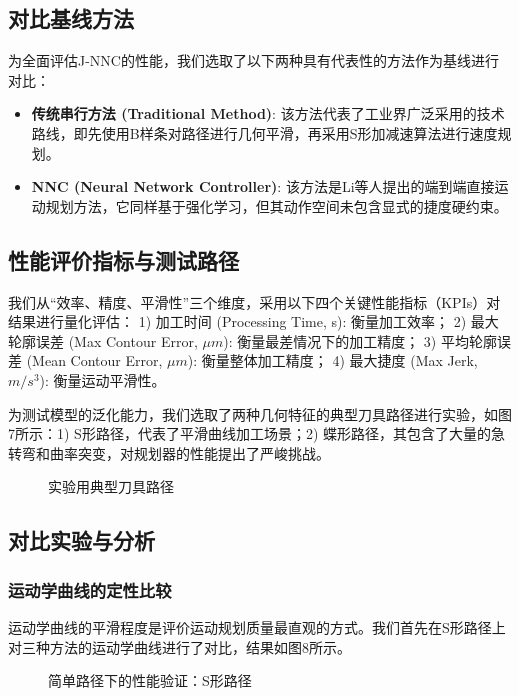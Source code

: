 \documentclass[preprint,12pt]{elsarticle}
\begin{document}
\subsection{对比基线方法}
为全面评估J-NNC的性能，我们选取了以下两种具有代表性的方法作为基线进行对比：
\begin{itemize}
    \item \textbf{传统串行方法 (Traditional Method)}: 该方法代表了工业界广泛采用的技术路线，即先使用B样条对路径进行几何平滑，再采用S形加减速算法进行速度规划。
    \item \textbf{NNC (Neural Network Controller)}: 该方法是Li等人提出的端到端直接运动规划方法\cite{Li2020}，它同样基于强化学习，但其动作空间未包含显式的捷度硬约束。
\end{itemize}

\subsection{性能评价指标与测试路径}
我们从“效率、精度、平滑性”三个维度，采用以下四个关键性能指标（KPIs）对结果进行量化评估：
1) 加工时间 (Processing Time, s): 衡量加工效率；
2) 最大轮廓误差 (Max Contour Error, $\mu m$): 衡量最差情况下的加工精度；
3) 平均轮廓误差 (Mean Contour Error, $\mu m$): 衡量整体加工精度；
4) 最大捷度 (Max Jerk, $m/s^3$): 衡量运动平滑性。

为测试模型的泛化能力，我们选取了两种几何特征的典型刀具路径进行实验，如图7所示：1) S形路径，代表了平滑曲线加工场景；2) 蝶形路径，其包含了大量的急转弯和曲率突变，对规划器的性能提出了严峻挑战。

\begin{figure}[htbp]
    \centering
    \caption{实验用典型刀具路径}
    \label{fig:paths}
\end{figure}

\subsection{对比实验与分析}

\subsubsection{运动学曲线的定性比较}
运动学曲线的平滑程度是评价运动规划质量最直观的方式。我们首先在S形路径上对三种方法的运动学曲线进行了对比，结果如图8所示。

\begin{figure}[htbp]
    \centering
    \caption{简单路径下的性能验证：S形路径}
    \label{fig:curve_s}
\end{figure}
\end{document}
